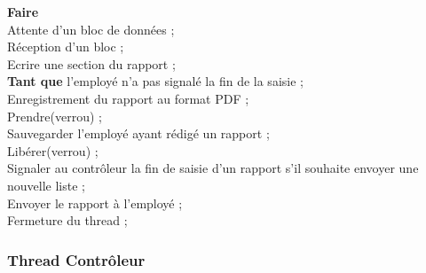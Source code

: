 \begin{tabbing}

\textbf{Faire} \= \\

	\> Attente d’un bloc de données ;\\

	\> Réception d’un bloc ;\\

	\> Ecrire une section du rapport ;\\

\textbf{Tant que} l'employé n'a pas signalé la fin de la saisie ;\\


Enregistrement du rapport au format PDF ;\\

Prendre(verrou) ;\\

Sauvegarder l'employé ayant rédigé un rapport ;\\

Libérer(verrou) ;\\

Signaler au contrôleur la fin de saisie d'un rapport s'il souhaite envoyer une nouvelle liste ;\\

Envoyer le rapport à l'employé ;\\

Fermeture du thread ;

\end{tabbing}

\subsubsection{Thread Contrôleur}


